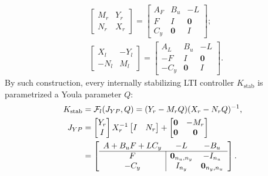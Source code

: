\begin{subequations}
\begin{align}
& \left[\begin{array}{cc}
    M_r & Y_r \\
    N_r & X_r
    \end{array}\right]
    =\left[
    \begin{array}{c|cc}
        A_F & B_u & -L \\
        \hline
        F & I & \mathbf{0}\\
        C_y & \mathbf{0} & I
    \end{array}\right];  \label{DCF_r} \\
& \left[\begin{array}{cc}
    X_l & -Y_l \\
    -N_l & M_l
    \end{array}\right]
    =\left[
    \begin{array}{c|cc}
        A_L & B_u & -L \\
        \hline
        -F & I & \mathbf{0}\\
        -C_y & \mathbf{0} & I
    \end{array}\right]. \label{DCF_l}
\end{align}
\end{subequations}
By such construction, every internally stabilizing LTI controller \(K_{\mathrm{stab}}\) is parametrized a Youla parameter \(Q\):
\begin{equation}\label{eqn::allstabK}
\begin{split}
K_{\mathrm{stab}} & = {\mathcal{F}_l}(J_{YP},Q) 
    = (Y_r - M_r Q) (X_r - N_r Q)^{-1}, \\
J_{YP} & = \begin{bmatrix}
    Y_r \\
    I
\end{bmatrix} X_r^{-1} 
\begin{bmatrix}
    I & N_r
\end{bmatrix} + 
\begin{bmatrix}
    \mathbf{0} & -M_r \\
    \mathbf{0} & \mathbf{0}
\end{bmatrix} \\
& = \left[
\begin{array}{c|cc}
  A +B_u F +L C_y&-L  & -B_u \\
  \hline
  F & \mathbf{0}_{n_u,n_y}& -I_{n_u}\\
  -C_y& I_{n_y} &\mathbf{0}_{n_y,n_u}
\end{array}
\right].
\end{split}
\end{equation}
